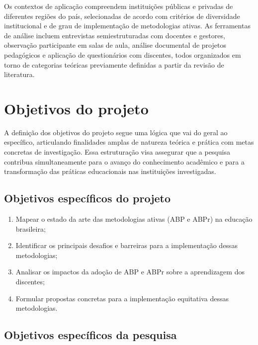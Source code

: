 Os contextos de aplicação compreendem instituições públicas e privadas de diferentes regiões do país, selecionadas de acordo com critérios de diversidade institucional e de grau de implementação de metodologias ativas. As ferramentas de análise incluem entrevistas semiestruturadas com docentes e gestores, observação participante em salas de aula, análise documental de projetos pedagógicos e aplicação de questionários com discentes, todos organizados em torno de categorias teóricas previamente definidas a partir da revisão de literatura.


\section{Objetivos do projeto}
\label{sec:objetivos_projeto}

A definição dos objetivos do projeto segue uma lógica que vai do geral ao específico, articulando finalidades amplas de natureza teórica e prática com metas concretas de investigação. Essa estruturação visa assegurar que a pesquisa contribua simultaneamente para o avanço do conhecimento acadêmico e para a transformação das práticas educacionais nas instituições investigadas.

\subsection{Objetivos específicos do projeto}
\label{subsec:obj_especificos_projeto}

\begin{enumerate}
    \item Mapear o estado da arte das metodologias ativas (ABP e ABPr) na educação brasileira;
    \item Identificar os principais desafios e barreiras para a implementação dessas metodologias;
    \item Analisar os impactos da adoção de ABP e ABPr sobre a aprendizagem dos discentes;
    \item Formular propostas concretas para a implementação equitativa dessas metodologias.
\end{enumerate}

\subsection{Objetivos específicos da pesquisa}
\label{subsec:obj_especificos_pesquisa}

